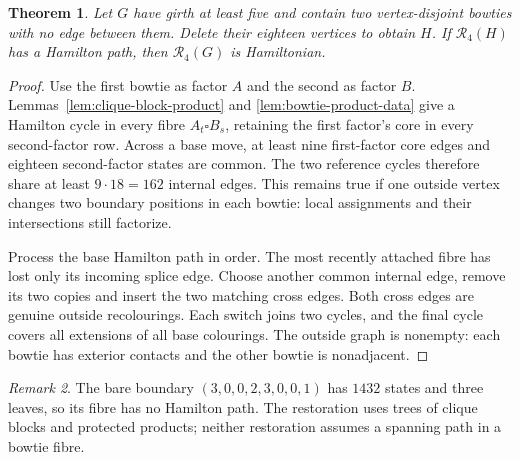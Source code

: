 \documentclass[11pt]{article}
\newtheorem{theorem}{Theorem}[section]
\theoremstyle{remark}
\newtheorem{remark}[theorem]{Remark}
\newcommand{\R}{\mathcal R}
\numberwithin{equation}{section}
\numberwithin{table}{section}
\begin{document}
\begin{theorem}\label{thm:paired-bowties}
Let $G$ have girth at least five and contain two vertex-disjoint bowties
with no edge between them. Delete their eighteen vertices to obtain $H$.
If $\R_4(H)$ has a Hamilton path, then $\R_4(G)$ is Hamiltonian.
\end{theorem}
\begin{proof}
Use the first bowtie as factor $A$ and the second as factor $B$.
Lemmas~\ref{lem:clique-block-product} and \ref{lem:bowtie-product-data}
give a Hamilton cycle in every fibre $A_t\square B_s$, retaining the
first factor's core in every second-factor row. Across a base move,
at least nine first-factor core edges and eighteen second-factor states
are common. The two reference cycles therefore share at least
$9\cdot18=162$ internal edges. This remains true if one outside vertex changes two boundary positions in each bowtie: local assignments and
their intersections still factorize.

Process the base Hamilton path in order. The most recently attached
fibre has lost only its incoming splice edge. Choose another common
internal edge, remove its two copies and insert the two matching cross
edges. Both cross edges are genuine outside recolourings. Each switch
joins two cycles, and the final cycle covers all extensions of all base
colourings. The outside graph is nonempty: each bowtie has exterior contacts and the
other bowtie is nonadjacent.
\end{proof}

\begin{remark}
The bare boundary $(3,0,0,2,3,0,0,1)$ has $1432$ states and three leaves,
so its fibre has no Hamilton path. The restoration uses trees of clique blocks and
protected products; neither restoration assumes a spanning path in a bowtie
fibre.
\end{remark}
\end{document}
